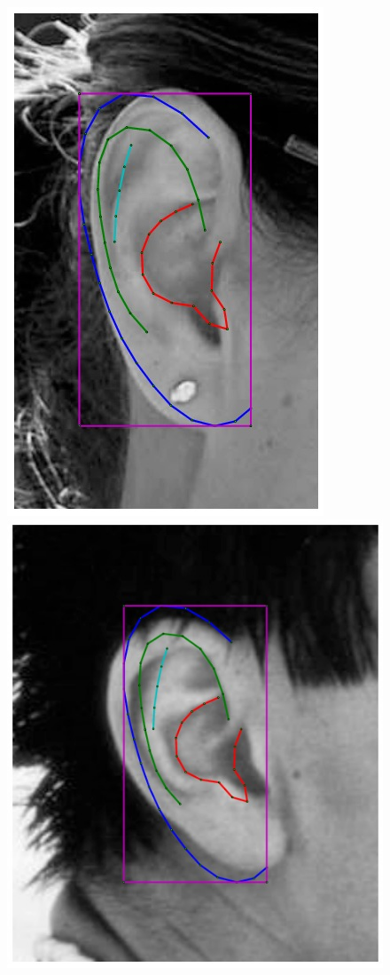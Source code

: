 \begin{figure}
    \\
    \newcommand{\flowhh}{0.255\columnwidth}
    \includegraphics[height=\flowhh]{resources/Ear_Deformable_Model/fittings/initial_0012}
    \hfill
    \includegraphics[height=\flowhh]{resources/Ear_Deformable_Model/fittings/initial_0022}

\end{figure}
